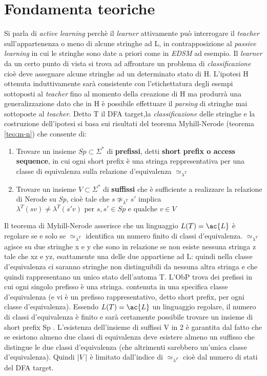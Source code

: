 \section{Fondamenta teoriche}
Si parla di \textit{active learning} perchè il \textit{learner} attivamente può interrogare il \textit{teacher} sull'appartenenza o meno di alcune stringhe ad \ac{L}, in contrapposizione al \textit{passive learning} in cui le stringhe sono date a priori come in \textit{EDSM} ad esempio. Il \textit{learner} da un certo punto di vista si trova ad affrontare un problema di \textit{classificazione} cioè deve assegnare alcune stringhe ad un determinato stato di \ac{H}. L'ipotesi \ac{H}  ottenuta induttivamente sarà consistente con l'etichettatura degli esempi sottoposti al \textit{teacher}  fino al momento della creazione di \ac{H} ma produrrà una generalizzazione dato che in \ac{H} è possibile effettuare il \textit{parsing} di stringhe mai sottoposte al \textit{teacher}. Detto T il \ac{DFA} target,la \textit{classificazione} delle stringhe e la costruzione dell'ipotesi si basa sui risultati del teorema Myhill-Nerode (teorema \ref{teo:m-n}) che consente di:
\begin{enumerate}
\item Trovare un insieme $Sp \subset \Sigma^{*}$ di \textbf{prefissi}, detti \textbf{short prefix o access sequence},   in cui ogni short prefix è una stringa reppresentativa per una classe di equivalenza sulla relazione d'equivalenza $\simeq_{\lambda^{T}}$
 \item Trovare un insieme $V \subset \Sigma^{*}$ di \textbf{suffissi} che è sufficiente a realizzare la relazione di Nerode su \textit{Sp}, cioè tale che $s \not\simeq_{\lambda^{T}} \!\!s'$ implica $\lambda^{T}(sv) \neq \lambda^{T}(s'v) \text{ per } s,s' \in Sp \text{ e qualche } v \in V$ 
\end{enumerate}
Il teorema di Myhill-Nerode asserisce che un linguaggio $L(T) = \ac{L}$ è regolare se e solo se $\simeq_{\lambda^{T}}$ identifica un numero finito di classi d'equivalenza. $\simeq_{\lambda^{T}}$ agisce su due stringhe x e y che sono in relazione se non esiste nessuna stringa z tale che xz e yz, esattamente una delle due appartiene ad \ac{L}: quindi nella classe d'equivalenza ci saranno stringhe non distinguibili da nessuna altra stringa e che quindi rappresentano un unico stato dell'automa T. L'\ac{ObP} trova dei prefissi in cui ogni singolo prefisso è una stringa. contenuta in una specifica classe d'equivalenza (e vi è un prefisso rappresentativo, detto short prefix, per ogni classe d'equivalenza). Essendo  $L(T)=\ac{L}$ un linguaggio regolare, il numero di classi d'equivalenza è finito e sarà certamente possibile trovare un insieme di short prefix Sp . L'esistenza dell'insieme di suffissi V in 2 è garantita dal fatto che se esistono almeno due classi di equivalenza deve esistere almeno un suffisso che distingue le due classi d'equivalenza (che altrimenti sarebbero un'unica classe d'equivalenza). Quindi $\lvert V\rvert$ è limitato dall'indice di $\simeq_{\lambda^{T}}$ cioè dal numero di stati del \ac{DFA} target.
